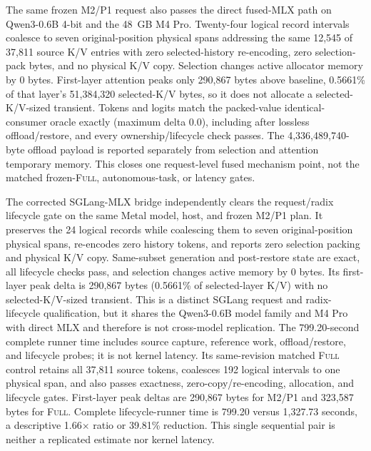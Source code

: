 \documentclass[11pt]{article}
\begin{document}
The same frozen M2/P1 request also passes the direct fused-MLX path on
Qwen3-0.6B 4-bit and the 48~GB M4 Pro.  Twenty-four logical record intervals
coalesce to seven original-position physical spans addressing the same 12,545
of 37,811 source K/V entries with zero selected-history re-encoding, zero
selection-pack bytes, and no physical K/V copy.  Selection changes active
allocator memory by 0 bytes.  First-layer attention peaks only 290,867 bytes
above baseline, 0.5661\% of that layer's 51,384,320 selected-K/V
bytes, so it does not allocate a selected-K/V-sized transient.  Tokens and
logits match the packed-value identical-consumer oracle exactly (maximum delta
0.0), including after lossless offload/restore, and every ownership/lifecycle
check passes.  The 4,336,489,740-byte offload payload is reported separately
from selection and attention temporary memory.  This closes one request-level
fused mechanism point, not the matched frozen-\textsc{Full}, autonomous-task,
or latency gates.

The corrected SGLang-MLX bridge independently clears the request/radix
lifecycle gate on the same Metal model, host, and frozen M2/P1 plan.  It
preserves the 24 logical records while coalescing them to seven
original-position physical spans, re-encodes zero history tokens, and reports
zero selection packing and physical K/V copy.  Same-subset generation and
post-restore state are exact, all lifecycle checks pass, and selection changes
active memory by 0 bytes.  Its first-layer peak delta is 290,867 bytes
(0.5661\% of selected-layer K/V) with no selected-K/V-sized transient.  This
is a distinct SGLang request and radix-lifecycle qualification, but it shares
the Qwen3-0.6B model family and M4 Pro with direct MLX and therefore is not
cross-model replication.  The 799.20-second complete runner time includes
source capture, reference work, offload/restore, and lifecycle probes; it is
not kernel latency.  Its same-revision matched \textsc{Full} control retains
all 37,811 source tokens, coalesces 192 logical intervals to one physical span,
and also passes exactness, zero-copy/re-encoding, allocation, and lifecycle
gates.  First-layer peak deltas are 290,867 bytes for M2/P1 and 323,587 bytes
for \textsc{Full}.  Complete lifecycle-runner time is 799.20 versus 1,327.73
seconds, a descriptive 1.66$\times$ ratio or 39.81\% reduction.  This single
sequential pair is neither a replicated estimate nor kernel latency.
\end{document}

